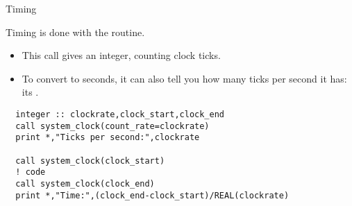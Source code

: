 
 {Timing}

Timing is done with the  routine.
\begin{itemize}
\item This call gives an integer, counting clock ticks.
\item To convert to seconds, it can also tell you how many ticks per
  second it has: its .
\end{itemize}

\begin{verbatim}
  integer :: clockrate,clock_start,clock_end
  call system_clock(count_rate=clockrate)
  print *,"Ticks per second:",clockrate

  call system_clock(clock_start)
  ! code
  call system_clock(clock_end)
  print *,"Time:",(clock_end-clock_start)/REAL(clockrate)
\end{verbatim}
